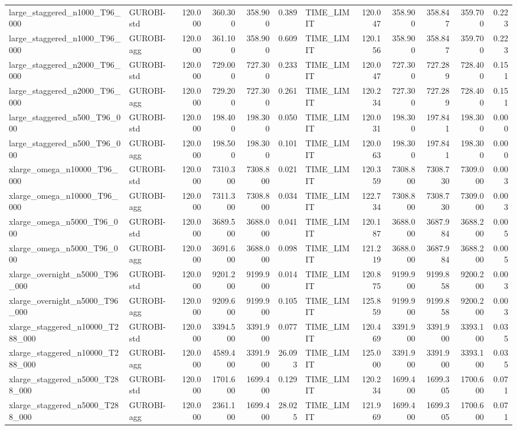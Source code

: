 \begin{table}[htbp]
\begin{tabular}{llrrrrlrrrrr}
large\_staggered\_n1000\_T96\_000 & GUROBI-std & 120.000 & 360.300 & 358.900 & 0.389 & TIME\_LIMIT & 120.047 & 358.900 & 358.847 & 359.700 & 0.223 \\
large\_staggered\_n1000\_T96\_000 & GUROBI-agg & 120.000 & 361.100 & 358.900 & 0.609 & TIME\_LIMIT & 120.156 & 358.900 & 358.847 & 359.700 & 0.223 \\
large\_staggered\_n2000\_T96\_000 & GUROBI-std & 120.000 & 729.000 & 727.300 & 0.233 & TIME\_LIMIT & 120.047 & 727.300 & 727.289 & 728.400 & 0.151 \\
large\_staggered\_n2000\_T96\_000 & GUROBI-agg & 120.000 & 729.200 & 727.300 & 0.261 & TIME\_LIMIT & 120.234 & 727.300 & 727.289 & 728.400 & 0.151 \\
large\_staggered\_n500\_T96\_000 & GUROBI-std & 120.000 & 198.400 & 198.300 & 0.050 & TIME\_LIMIT & 120.031 & 198.300 & 197.841 & 198.300 & 0.000 \\
large\_staggered\_n500\_T96\_000 & GUROBI-agg & 120.000 & 198.500 & 198.300 & 0.101 & TIME\_LIMIT & 120.063 & 198.300 & 197.841 & 198.300 & 0.000 \\
xlarge\_omega\_n10000\_T96\_000 & GUROBI-std & 120.000 & 7310.300 & 7308.800 & 0.021 & TIME\_LIMIT & 120.359 & 7308.800 & 7308.730 & 7309.000 & 0.003 \\
xlarge\_omega\_n10000\_T96\_000 & GUROBI-agg & 120.000 & 7311.300 & 7308.800 & 0.034 & TIME\_LIMIT & 122.734 & 7308.800 & 7308.730 & 7309.000 & 0.003 \\
xlarge\_omega\_n5000\_T96\_000 & GUROBI-std & 120.000 & 3689.500 & 3688.000 & 0.041 & TIME\_LIMIT & 120.187 & 3688.000 & 3687.984 & 3688.200 & 0.005 \\
xlarge\_omega\_n5000\_T96\_000 & GUROBI-agg & 120.000 & 3691.600 & 3688.000 & 0.098 & TIME\_LIMIT & 121.219 & 3688.000 & 3687.984 & 3688.200 & 0.005 \\
xlarge\_overnight\_n5000\_T96\_000 & GUROBI-std & 120.000 & 9201.200 & 9199.900 & 0.014 & TIME\_LIMIT & 120.875 & 9199.900 & 9199.858 & 9200.200 & 0.003 \\
xlarge\_overnight\_n5000\_T96\_000 & GUROBI-agg & 120.000 & 9209.600 & 9199.900 & 0.105 & TIME\_LIMIT & 125.859 & 9199.900 & 9199.858 & 9200.200 & 0.003 \\
xlarge\_staggered\_n10000\_T288\_000 & GUROBI-std & 120.000 & 3394.500 & 3391.900 & 0.077 & TIME\_LIMIT & 120.469 & 3391.900 & 3391.900 & 3393.100 & 0.035 \\
xlarge\_staggered\_n10000\_T288\_000 & GUROBI-agg & 120.000 & 4589.400 & 3391.900 & 26.093 & TIME\_LIMIT & 125.000 & 3391.900 & 3391.900 & 3393.100 & 0.035 \\
xlarge\_staggered\_n5000\_T288\_000 & GUROBI-std & 120.000 & 1701.600 & 1699.400 & 0.129 & TIME\_LIMIT & 120.234 & 1699.400 & 1699.305 & 1700.600 & 0.071 \\
xlarge\_staggered\_n5000\_T288\_000 & GUROBI-agg & 120.000 & 2361.100 & 1699.400 & 28.025 & TIME\_LIMIT & 121.969 & 1699.400 & 1699.305 & 1700.600 & 0.071 \\
\bottomrule
\end{tabular}
\end{table}
